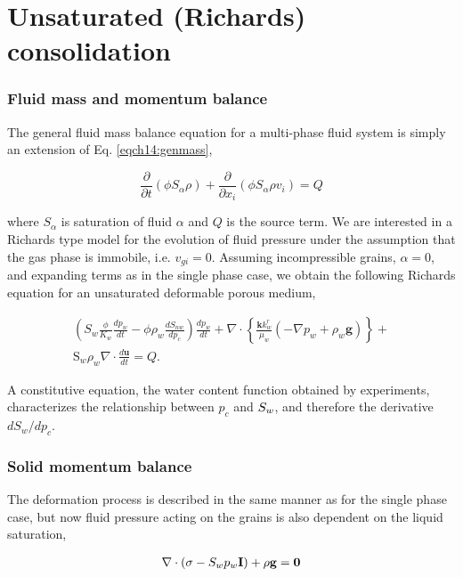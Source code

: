 \section{Unsaturated (Richards) consolidation}

\subsubsection*{Fluid mass and momentum balance}
The general fluid mass balance equation for a multi-phase fluid system is simply an extension of Eq. \ref{eqch14:genmass},

\begin{equation}
\frac{\partial }{\partial t}\left( \phi {{S}_{\alpha }}\rho  \right)+\frac{\partial }{\partial {{x}_{i}}}\left( \phi {{S}_{\alpha }}\rho {{v}_{i}} \right)=Q
\end{equation}

where $S_\alpha$ is saturation of fluid $\alpha $ and $Q$ is the source term. We are interested in a Richards type model for the evolution of fluid pressure under the assumption that the gas phase is immobile, i.e. $v_{gi}=0$. Assuming incompressible grains, $\alpha =0$, and expanding terms as in the single phase case, we obtain the following Richards equation for an unsaturated deformable porous medium,

\begin{eqnarray}
\left( {{S}_{w}}\frac{\phi }{{{K}_{w}}}\frac{d{{p}_{w}}}{dt}-\phi {{\rho }_{w}}\frac{d{{S}_{nw}}}{d{{p}_{c}}} \right)\frac{d{{p}_{w}}}{dt}+\nabla \cdot \left\{ \frac{\mathbf{k}k_{w}^{r}}{{{\mu }_{w}}}\left( -\nabla {{p}_{w}}+{{\rho }_{w}}\mathbf{g} \right) \right\}+\nonumber\\
{{\text{S}}_{w}}{{\rho }_{w}}\nabla \cdot \frac{d\mathbf{u}}{dt}=Q.
\label{eqn:uc2}
\end{eqnarray}

A constitutive equation, the water content function obtained by experiments, characterizes the relationship between $p_c$ and $S _w$, and therefore the derivative $dS_w/dp_c$.

\subsubsection*{Solid momentum balance}
The deformation process is described in the same manner as for the single phase case, but now fluid pressure acting on the grains is also dependent on the liquid saturation,

\begin{eqnarray}
\nabla\cdot
(\sigma - S_w p_w \bf I) + \rho g = 0
\label{eqn:mb_us}
\end{eqnarray}

